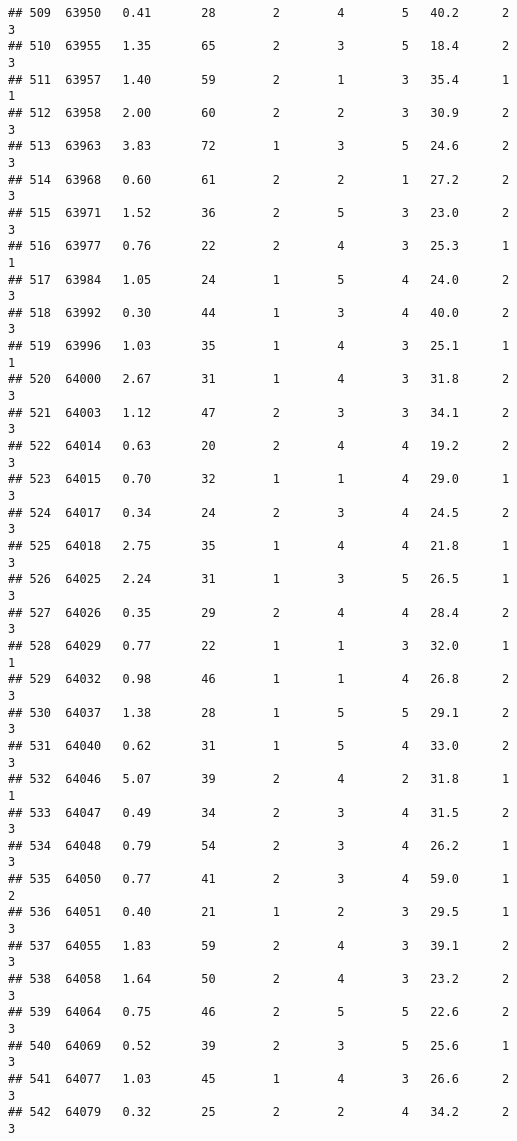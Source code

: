 \documentclass[
]{article}
\begin{document}
\begin{verbatim}
## 509  63950   0.41       28        2        4        5   40.2      2      3
## 510  63955   1.35       65        2        3        5   18.4      2      3
## 511  63957   1.40       59        2        1        3   35.4      1      1
## 512  63958   2.00       60        2        2        3   30.9      2      3
## 513  63963   3.83       72        1        3        5   24.6      2      3
## 514  63968   0.60       61        2        2        1   27.2      2      3
## 515  63971   1.52       36        2        5        3   23.0      2      3
## 516  63977   0.76       22        2        4        3   25.3      1      1
## 517  63984   1.05       24        1        5        4   24.0      2      3
## 518  63992   0.30       44        1        3        4   40.0      2      3
## 519  63996   1.03       35        1        4        3   25.1      1      1
## 520  64000   2.67       31        1        4        3   31.8      2      3
## 521  64003   1.12       47        2        3        3   34.1      2      3
## 522  64014   0.63       20        2        4        4   19.2      2      3
## 523  64015   0.70       32        1        1        4   29.0      1      3
## 524  64017   0.34       24        2        3        4   24.5      2      3
## 525  64018   2.75       35        1        4        4   21.8      1      3
## 526  64025   2.24       31        1        3        5   26.5      1      3
## 527  64026   0.35       29        2        4        4   28.4      2      3
## 528  64029   0.77       22        1        1        3   32.0      1      1
## 529  64032   0.98       46        1        1        4   26.8      2      3
## 530  64037   1.38       28        1        5        5   29.1      2      3
## 531  64040   0.62       31        1        5        4   33.0      2      3
## 532  64046   5.07       39        2        4        2   31.8      1      1
## 533  64047   0.49       34        2        3        4   31.5      2      3
## 534  64048   0.79       54        2        3        4   26.2      1      3
## 535  64050   0.77       41        2        3        4   59.0      1      2
## 536  64051   0.40       21        1        2        3   29.5      1      3
## 537  64055   1.83       59        2        4        3   39.1      2      3
## 538  64058   1.64       50        2        4        3   23.2      2      3
## 539  64064   0.75       46        2        5        5   22.6      2      3
## 540  64069   0.52       39        2        3        5   25.6      1      3
## 541  64077   1.03       45        1        4        3   26.6      2      3
## 542  64079   0.32       25        2        2        4   34.2      2      3

\end{verbatim}
\end{document}
